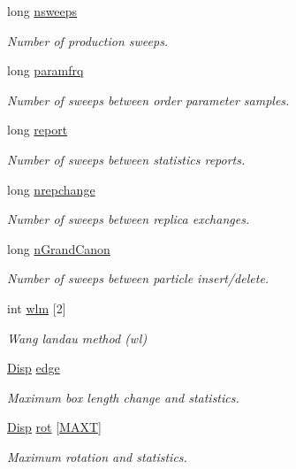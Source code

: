 \begin{DoxyCompactItemize}
long \hyperlink{class_sim_a75f988cb78b30aeae402e4f63f28bfcc}{nsweeps}
\begin{DoxyCompactList}\small\item\em Number of production sweeps. \end{DoxyCompactList}\item 
long \hyperlink{class_sim_acc700b6bf4b51dae5604a8480a8054c9}{paramfrq}
\begin{DoxyCompactList}\small\item\em Number of sweeps between order parameter samples. \end{DoxyCompactList}\item 
long \hyperlink{class_sim_a7ff9e858e99db9ed0d65107f892d7447}{report}
\begin{DoxyCompactList}\small\item\em Number of sweeps between statistics reports. \end{DoxyCompactList}\item 
long \hyperlink{class_sim_a380b916e43b3eadc916f7695c9d60555}{nrepchange}
\begin{DoxyCompactList}\small\item\em Number of sweeps between replica exchanges. \end{DoxyCompactList}\item 
long \hyperlink{class_sim_a5590bfd944244ebfe9b72fa43563162e}{n\+Grand\+Canon}
\begin{DoxyCompactList}\small\item\em Number of sweeps between particle insert/delete. \end{DoxyCompactList}\item 
int \hyperlink{class_sim_a43570c2d1a73631e8c00f5512a8486b6}{wlm} \mbox{[}2\mbox{]}
\begin{DoxyCompactList}\small\item\em Wang landau method (wl) \end{DoxyCompactList}\item 
\hyperlink{class_disp}{Disp} \hyperlink{class_sim_a1880ddedceb3460fd343d0f847032fdf}{edge}
\begin{DoxyCompactList}\small\item\em Maximum box length change and statistics. \end{DoxyCompactList}\item 
\hyperlink{class_disp}{Disp} \hyperlink{class_sim_a434d5b10fc6a3bf6fec51eaaf9ff83cb}{rot} \mbox{[}\hyperlink{macros_8h_a3f79fdecc884eb98c97d1bdc77455295}{M\+A\+X\+T}\mbox{]}
\begin{DoxyCompactList}\small\item\em Maximum rotation and statistics. \end{DoxyCompactList}\item 

\end{DoxyCompactItemize}

